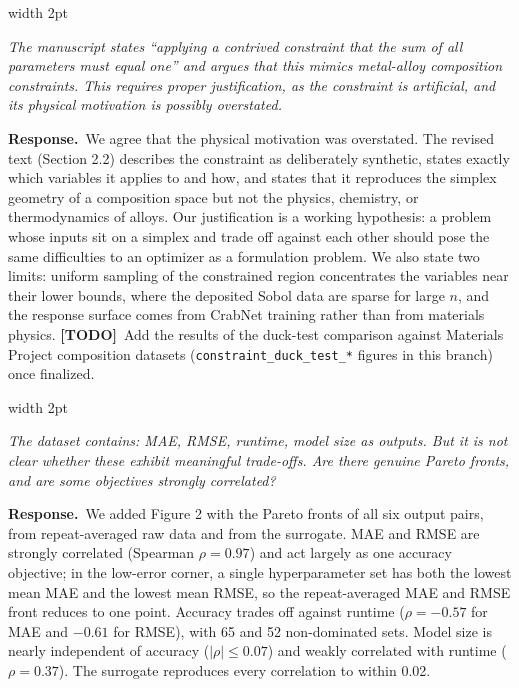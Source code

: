 \documentclass[11pt]{article}
\newenvironment{comment}
  {\par\medskip\noindent
   \begingroup\color{revrule}\leaders\vrule width 2pt\hfill\kern0pt\par\nobreak
   \endgroup
   \begin{list}{}{\setlength{\leftmargin}{1.5em}\setlength{\rightmargin}{0.5em}}%
   \item\itshape\ignorespaces}
  {\end{list}\par}
\newcommand{\response}{\par\noindent\textbf{\color{respblue}Response.}\ }
\newcommand{\todo}{\textbf{\color{red}[TODO]}\ }
\begin{document}
\begin{comment}
The manuscript states ``applying a contrived constraint that the sum of all parameters must equal one'' and argues that this mimics metal-alloy composition constraints. This requires proper justification, as the constraint is artificial, and its physical motivation is possibly overstated.
\end{comment}
\response We agree that the physical motivation was overstated. The revised text (Section 2.2) describes the constraint as deliberately synthetic, states exactly which variables it applies to and how, and states that it reproduces the simplex geometry of a composition space but not the physics, chemistry, or thermodynamics of alloys. Our justification is a working hypothesis: a problem whose inputs sit on a simplex and trade off against each other should pose the same difficulties to an optimizer as a formulation problem. We also state two limits: uniform sampling of the constrained region concentrates the variables near their lower bounds, where the deposited Sobol data are sparse for large $n$, and the response surface comes from CrabNet training rather than from materials physics. \todo Add the results of the duck-test comparison against Materials Project composition datasets (\texttt{constraint\_duck\_test\_*} figures in this branch) once finalized.

\begin{comment}
The dataset contains: MAE, RMSE, runtime, model size as outputs. But it is not clear whether these exhibit meaningful trade-offs. Are there genuine Pareto fronts, and are some objectives strongly correlated?
\end{comment}
\response We added Figure 2 with the Pareto fronts of all six output pairs, from repeat-averaged raw data and from the surrogate. MAE and RMSE are strongly correlated (Spearman $\rho = 0.97$) and act largely as one accuracy objective; in the low-error corner, a single hyperparameter set has both the lowest mean MAE and the lowest mean RMSE, so the repeat-averaged MAE and RMSE front reduces to one point. Accuracy trades off against runtime ($\rho = -0.57$ for MAE and $-0.61$ for RMSE), with 65 and 52 non-dominated sets. Model size is nearly independent of accuracy ($|\rho| \le 0.07$) and weakly correlated with runtime ($\rho = 0.37$). The surrogate reproduces every correlation to within 0.02.
\end{document}

